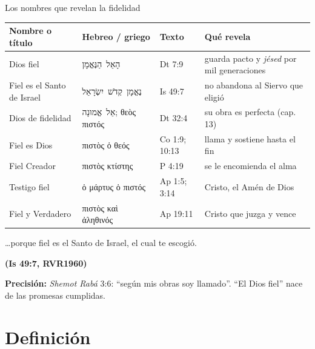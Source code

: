 \documentclass[hyperref={bookmarks=false},aspectratio=169]{beamer}
\newcommand{\heb}[1]{\mbox{\foreignlanguage{hebrew}{#1}}}
\newcommand{\grc}[1]{\foreignlanguage{ancientgreek}{#1}}
\newcommand{\fuente}[1]{\par\hfill{\upshape\bfseries\footnotesize\textcolor{azul}{#1}}}
\newcommand{\precision}[1]{{\footnotesize\color{gris}\textbf{Precisión:} #1}}
\begin{document}
\begin{frame}{Los nombres que revelan la fidelidad}
\scriptsize\renewcommand{\arraystretch}{1.14}
\begin{tabular}{@{}>{\RaggedRight\arraybackslash}p{2.5cm}>{\RaggedRight\arraybackslash}p{3.0cm}>{\RaggedRight\arraybackslash}p{1.9cm}>{\RaggedRight\arraybackslash}p{4.4cm}@{}}
\toprule
\textbf{Nombre o título} & \textbf{Hebreo / griego} & \textbf{Texto} & \textbf{Qué revela} \\ \midrule
Dios fiel & \heb{הָאֵל הַנֶּאֱמָן} & Dt 7:9 & guarda pacto y \emph{jésed} por mil generaciones \\
Fiel es el Santo de Israel & \heb{נֶאֱמָן קְדֹשׁ יִשְׂרָאֵל} & Is 49:7 & no abandona al Siervo que eligió \\
Dios de fidelidad & \heb{אֵל אֱמוּנָה}; \grc{θεὸς πιστός} & Dt 32:4 & su obra es perfecta (cap. 13) \\
Fiel es Dios & \grc{πιστὸς ὁ θεός} & 1 Co 1:9; 10:13 & llama y sostiene hasta el fin \\
Fiel Creador & \grc{πιστὸς κτίστης} & 1 P 4:19 & se le encomienda el alma \\
Testigo fiel & \grc{ὁ μάρτυς ὁ πιστός} & Ap 1:5; 3:14 & Cristo, el Amén de Dios \\
Fiel y Verdadero & \grc{πιστὸς καὶ ἀληθινός} & Ap 19:11 & Cristo que juzga y vence \\
\bottomrule
\end{tabular}\par\medskip
\begin{cita}\ldots{}porque fiel es el Santo de Israel, el cual te escogió.\fuente{(Is 49:7, RVR1960)}\end{cita}
\precision{\emph{Shemot Rabá} 3:6: ``según mis obras soy llamado''. ``El Dios fiel'' nace de las promesas cumplidas.}
\end{frame}

\section{Definición}
\end{document}
